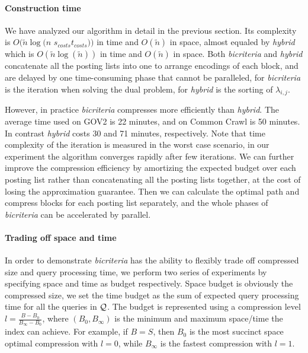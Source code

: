 \documentclass{sig-alternate-05-2015}
\begin{document}
\paragraph*{Construction time}
We have analyzed our algorithm in detail in the previous section.
Its complexity is $ O(\tilde{n} \log(n $ $ s_{costs} t_{costs})) $ in time and $ O(\tilde{n}) $ in space, almost equaled by \textit{hybrid} which is $ O(\tilde{n}\log(\tilde{n})) $ in time and $ O(\tilde{n}) $ in space.
Both \textit{bicriteria} and \textit{hybrid} concatenate all the posting lists into one to arrange encodings of each block, and are delayed by one time-consuming phase that cannot be paralleled, for \textit{bicriteria} is the iteration when solving the dual problem, for \textit{hybrid} is the sorting of $ \lambda_{i,j} $.

However, in practice \textit{bicriteria} compresses more efficiently than \textit{hybrid}.
The average time used on GOV2 is 22 minutes, and on Common Crawl is 50 minutes.
In contrast \textit{hybrid} costs 30 and 71 minutes, respectively.
Note that time complexity of the iteration is measured in the worst case scenario, in our experiment the algorithm converges rapidly after few iterations.
We can further improve the compression efficiency by amortizing the expected budget over each posting list rather than concatenating all the posting lists together, at the cost of losing the approximation guarantee.
Then we can calculate the optimal path and compress blocks for each posting list separately, and the whole phases of \textit{bicriteria} can be accelerated by parallel.

\paragraph*{Trading off space and time}
In order to demonstrate \textit{bicriteria} has the ability to flexibly trade off compressed size and query processing time, we perform two series of experiments by specifying space and time as budget respectively.
Space budget is obviously the compressed size, we set the time budget as the sum of expected query processing time for all the queries in $ \cal Q $.
The budget is represented using a compression level $ l = \frac{B-B_0}{B_\infty-B_0} $, where $ (B_0,B_\infty) $ is the minimum and maximum space/time the index can achieve.
For example, if $ B = S $, then $ B_0 $ is the most succinct space optimal compression with $ l = 0 $, while $ B_\infty $ is the fastest compression with $ l = 1 $.
\end{document}
